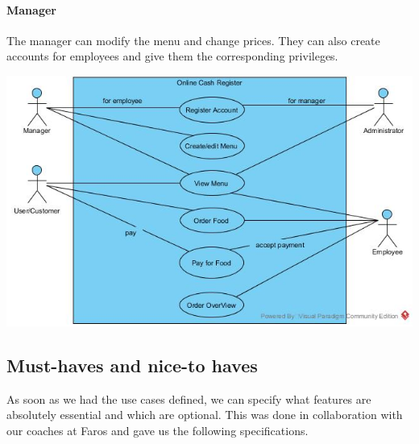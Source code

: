\documentclass[12pt]{article}
\newenvironment{Figure}
	{\par\medskip\noindent\minipage{\linewidth}}
	{\endminipage\par\medskip}
\begin{document}
\begin{multicols}{2}
\paragraph{Manager}
The manager can modify the menu and change prices. They can also create accounts for employees and give them the corresponding privileges.\\

\begin{Figure}
	\centering
	\includegraphics[width=\linewidth]{illustrations/usecase.jpg}
	\label{fig:usecase}
\end{Figure}

\subsection{Must-haves and nice-to haves}
As soon as we had the use cases defined, we can specify what features are absolutely essential and which are optional. This was done in collaboration with our coaches at Faros and gave us the following specifications.

\end{multicols}
\end{document}
